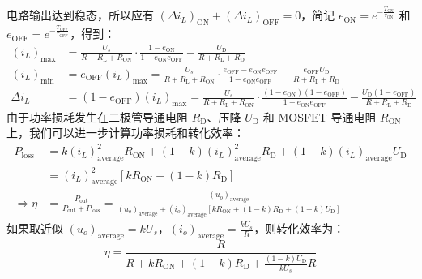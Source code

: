 \documentclass[UTF8]{article}
\theoremstyle{MyLineTheoremStyle} %
\theoremstyle{MyBlockTheoremStyle} %
\theoremstyle{MySubsubsectionStyle} %
\begin{document}
电路输出达到稳态，所以应有 $\left(\Delta i_L\right)_{\text{ON}} + \left(\Delta i_L\right)_{\text{OFF}} = 0$，简记 $e_{\text{ON}} = e^{-\frac{T_{\text{ON}}}{\tau_{\text{ON}}}}$ 和 $e_{\text{OFF}} = e^{-\frac{T_{\text{OFF}}}{\tau_{\text{OFF}}}}$，得到：
\begin{align}
\left(i_L\right)_{\max} &= \frac{U_s}{R + R_{\text{L}} + R_{\text{ON}}}\cdot \frac{1 - e_{\text{ON}}}{1 - e_{\text{ON}}e_{\text{OFF}}} - \frac{U_\text{D}}{R + R_{\text{L}} + R_{\text{D}}}
\\
\left(i_L\right)_{\min} &=  e_{\text{OFF}}\left(i_L\right)_{\max} =  \frac{U_s}{R + R_{\text{L}} + R_{\text{ON}}}\cdot \frac{e_{\text{OFF}} - e_{\text{ON}}e_{\text{OFF}}}{1 - e_{\text{ON}}e_{\text{OFF}}} - \frac{e_{\text{OFF}}U_\text{D}}{R + R_{\text{L}} + R_{\text{D}}}
\\
\Delta i_L &= \left(1  -e_{\text{OFF}}\right)\left(i_L\right)_{\max} = \frac{U_s}{R + R_{\text{L}} + R_{\text{ON}}}\cdot \frac{ (1 - e_{\text{ON}})(1 - e_{\text{OFF}}) }{1 - e_{\text{ON}}e_{\text{OFF}}} - \frac{ U_\text{D}(1 - e_{\text{OFF}})}{R + R_{\text{L}} + R_{\text{D}}}
\end{align}
由于功率损耗发生在二极管导通电阻 $R_{\text{D}}$、压降 $U_\text{D}$ 和 MOSFET 导通电阻 $R_{\text{ON}}$ 上，我们可以进一步计算功率损耗和转化效率：
\begin{align}
P_{\text{loss}} 
&= k\left(i_L\right)_{\text{average}}^2R_{\text{ON}} + (1 - k)\left(i_L\right)_{\text{average}}^2R_{\text{D}}
+ (1 - k)\left(i_L\right)_{\text{average}}U_\text{D} 
\\
&= \left(i_L\right)_{\text{average}}^2 \left[ k R_{\text{ON}} + (1 - k)R_{\text{D}} \right] \\ 
\Longrightarrow \eta &= \frac{P_{\text{out}}}{P_{\text{out}} + P_{\text{loss}} } = \frac{\left(u_o\right)_\text{average}}{\left(u_o\right)_\text{average} + \left(i_o\right)_{\text{average}} \left[ k R_{\text{ON}} + (1 - k)R_{\text{D}} + (1 - k)U_\text{D} \right]}
\end{align}
如果取近似 $\left(u_o\right)_\text{average} = kU_s$，$\left(i_o\right)_{\text{average}} = \frac{kU_s}{R}$，则转化效率为：
\begin{equation}
\eta = \frac{R}{R + kR_{\text{ON}} + (1-k)R_{\text{D}} +  \frac{(1 - k)U_\text{D}}{kU_s} R }
\end{equation}
\end{document}
